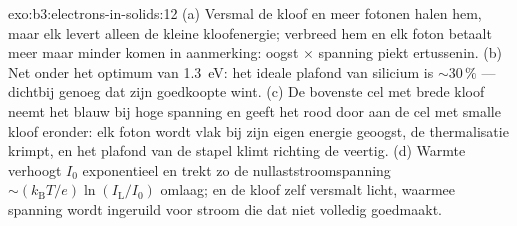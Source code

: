 \begin{solution}{exo:b3:electrons-in-solids:12}
(a) Versmal de kloof en meer fotonen halen hem, maar elk levert
alleen de kleine kloofenergie; verbreed hem en elk foton betaalt meer
maar minder komen in aanmerking: oogst $\times$ spanning piekt ertussenin.
(b) Net onder het optimum van \qty{1.3}{eV}: het ideale plafond
van silicium is $\sim30\,\%$ --- dichtbij genoeg dat zijn goedkoopte wint.
(c) De bovenste cel met brede kloof neemt het blauw bij hoge spanning en geeft
het rood door aan de cel met smalle kloof eronder: elk foton wordt vlak bij
zijn eigen energie geoogst, de thermalisatie krimpt, en het plafond van de stapel
klimt richting de veertig. (d) Warmte verhoogt $I_0$
exponentieel en trekt zo de nullaststroomspanning
$\sim(k_{\text{B}}T/e)\ln(I_{\text{L}}/I_0)$ omlaag; en de kloof zelf
versmalt licht, waarmee spanning wordt ingeruild voor stroom die dat niet volledig
goedmaakt.
\end{solution}

